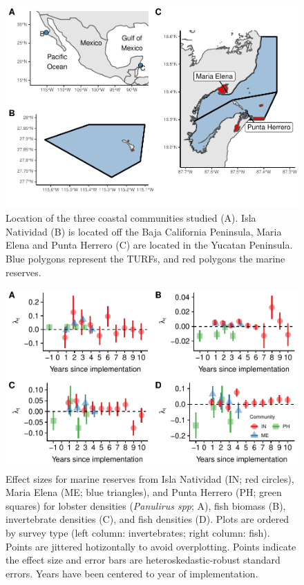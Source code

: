 \documentclass{frontiersSCNS}
\begin{document}
\begin{figure}
\centering
\includegraphics{manuscript_files/figure-latex/unnamed-chunk-7-1.pdf}
\caption{\label{fig:unnamed-chunk-7}\label{fig:map}Location of the three
coastal communities studied (A). Isla Natividad (B) is located off the
Baja California Peninsula, Maria Elena and Punta Herrero (C) are located
in the Yucatan Peninsula. Blue polygons represent the TURFs, and red
polygons the marine reserves.}
\end{figure}

\begin{figure}
\centering
\includegraphics{manuscript_files/figure-latex/unnamed-chunk-8-1.pdf}
\caption{\label{fig:unnamed-chunk-8}\label{fig:indicators}Effect sizes for
marine reserves from Isla Natividad (IN; red circles), Maria Elena (ME;
blue triangles), and Punta Herrero (PH; green squares) for lobster
densities (\emph{Panulirus spp}; A), fish biomass (B), invertebrate
densities (C), and fish densities (D). Plots are ordered by survey type
(left column: invertebrates; right column: fish). Points are jittered
hotizontally to avoid overplotting. Points indicate the effect size and
error bars are heteroskedastic-robust standard errors. Years have been
centered to year of implementation.}
\end{figure}
\end{document}
